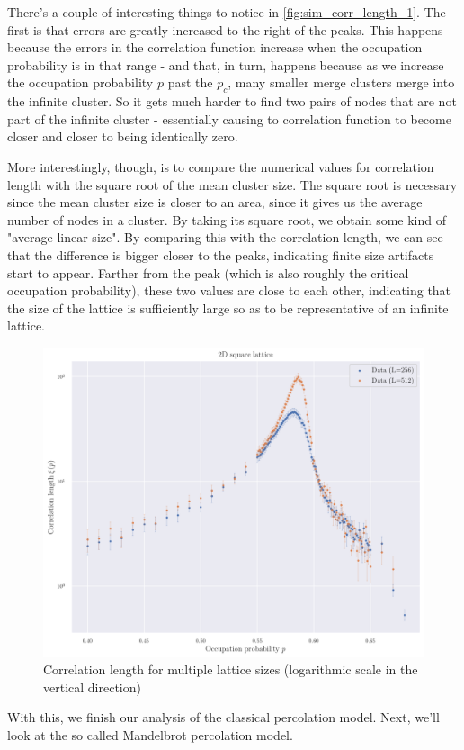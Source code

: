 There's a couple of interesting things to notice in \autoref{fig:sim_corr_length_1}. 
The first is that errors are greatly increased to the right of the peaks. This happens because the errors in the correlation function increase when the occupation probability is in that range - and that, in turn, happens because as we increase the occupation probability $p$ past the $p_c$, many smaller merge clusters merge into the infinite cluster. So it gets much harder to find two pairs of nodes that are not part of the infinite cluster - essentially causing to correlation function to become closer and closer to being identically zero.

More interestingly, though, is to compare the numerical values for correlation length with the square root of the mean cluster size. The square root is necessary since the mean cluster size is closer to an area, since it gives us the average number of nodes in a cluster. By taking its square root, we obtain some kind of "average linear size". By comparing this with the correlation length, we can see that the difference is bigger closer to the peaks, indicating finite size artifacts start to appear. Farther from the peak (which is also roughly the critical occupation probability), these two values are close to each other, indicating that the size of the lattice is sufficiently large so as to be representative of an infinite lattice. 


\begin{figure}[H]
  \includegraphics[width=\linewidth]{Images/sim_corr_length_1.png}
  \caption{Correlation length for multiple lattice sizes (logarithmic scale in the vertical direction)}
  \label{fig:sim_corr_length_1}
\end{figure}
    

With this, we finish our analysis of the classical percolation model. Next, we'll look at the so called Mandelbrot percolation model.